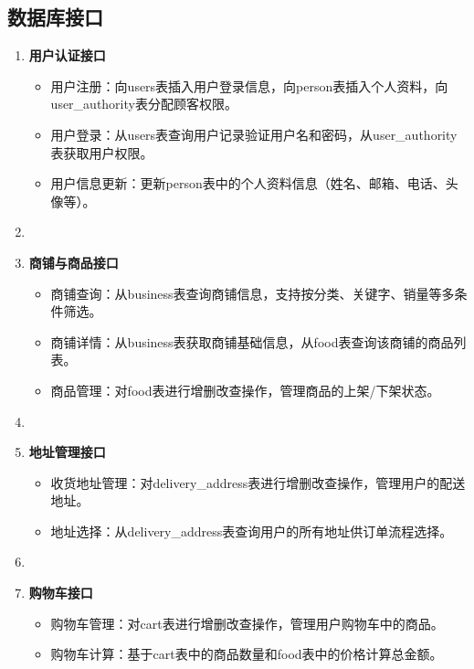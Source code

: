 \subsection{数据库接口}
\begin{enumerate}
    \item \textbf{用户认证接口}
          \begin{itemize}
              \item 用户注册：向users表插入用户登录信息，向person表插入个人资料，向user\_authority表分配顾客权限。
              \item 用户登录：从users表查询用户记录验证用户名和密码，从user\_authority表获取用户权限。
              \item 用户信息更新：更新person表中的个人资料信息（姓名、邮箱、电话、头像等）。
          \end{itemize}

    \item[]

    \item \textbf{商铺与商品接口}
          \begin{itemize}
              \item 商铺查询：从business表查询商铺信息，支持按分类、关键字、销量等多条件筛选。
              \item 商铺详情：从business表获取商铺基础信息，从food表查询该商铺的商品列表。
              \item 商品管理：对food表进行增删改查操作，管理商品的上架/下架状态。
          \end{itemize}

    \item[]

    \item \textbf{地址管理接口}
          \begin{itemize}
              \item 收货地址管理：对delivery\_address表进行增删改查操作，管理用户的配送地址。
              \item 地址选择：从delivery\_address表查询用户的所有地址供订单流程选择。
          \end{itemize}

    \item[]

    \item \textbf{购物车接口}
          \begin{itemize}
              \item 购物车管理：对cart表进行增删改查操作，管理用户购物车中的商品。
              \item 购物车计算：基于cart表中的商品数量和food表中的价格计算总金额。
          \end{itemize}


\end{enumerate}
